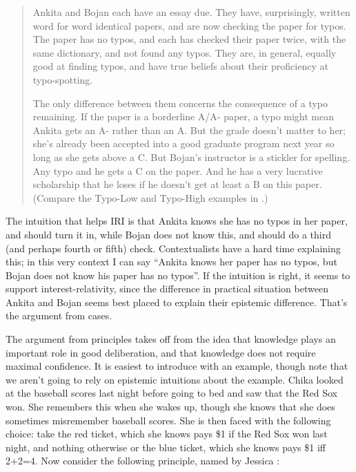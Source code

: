 \begin{quote}

Ankita and Bojan each have an essay due. They have, surprisingly, written word for word identical papers, and are now checking the paper for typos. The paper has no typos, and each has checked their paper twice, with the same dictionary, and not found any typos. They are, in general, equally good at finding typos, and have true beliefs about their proficiency at typo-spotting. 

The only difference between them concerns the consequence of a typo remaining. If the paper is a borderline A\slash A- paper, a typo might mean Ankita gets an A- rather than an A. But the grade doesn't matter to her; she's already been accepted into a good graduate program next year so long as she gets above a C. But Bojan's instructor is a stickler for spelling. Any typo and he gets a C on the paper. And he has a very lucrative scholarship that he loses if he doesn't get at least a B on this paper. (Compare the Typo-Low and Typo-High examples in  \citet[199]{Pinillos2012}.)
\end{quote}
The intuition that helps IRI is that Ankita knows she has no typos in her paper, and should turn it in, while Bojan does not know this, and should do a third (and perhaps fourth or fifth) check. Contextualists have a hard time explaining this; in this very context I can say ``Ankita knows her paper has no typos, but Bojan does not know his paper has no typos''. If the intuition is right, it seems to support interest-relativity, since the difference in practical situation between Ankita and Bojan seems best placed to explain their epistemic difference. That's the argument from cases.

The argument from principles takes off from the idea that knowledge plays an important role in good deliberation, and that knowledge does not require maximal confidence. It is easiest to introduce with an example, though note that we aren't going to rely on epistemic intuitions about the example. Chika looked at the baseball scores last night before going to bed and saw that the Red Sox won. She remembers this when she wakes up, though she knows that she does sometimes misremember baseball scores. She is then faced with the following choice: take the red ticket, which she knows pays \$1 if the Red Sox won last night, and nothing otherwise or the blue ticket, which she knows pays \$1 iff 2+2=4. Now consider the following principle, named by Jessica  \citet{Brown2013}:

